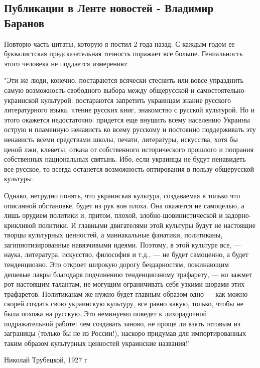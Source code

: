  
 
 
 
 

\subsection{Публикации в Ленте новостей - Владимир Баранов}
\label{sec:01_05_2021.fb.igrunov_vjacheslav.1.ukrainstvo_trubeckoj_nikolaj}

Повторю часть цитаты, которую я постил 2 года назад. С каждым годом ее
буквалистская предсказательная точность поражает все больше. Гениальность этого
человека не поддается измерению:

"Эти же люди, конечно, постараются всячески стеснить или вовсе упразднить самую
возможность свободного выбора между общерусской и самостоятельно-украинской
культурой: постараются запретить украинцам знание русского литературного языка,
чтение русских книг, знакомство с русской культурой. Но и этого окажется
недостаточно: придется еще внушить всему населению Украины острую и пламенную
ненависть ко всему русскому и постоянно поддерживать эту ненависть всеми
средствами школы, печати, литературы, искусства, хотя бы ценой лжи, клеветы,
отказа от собственного исторического прошлого и попрания собственных
национальных святынь. Ибо, если украинцы не будут ненавидеть все русское, то
всегда останется возможность оптирования в пользу общерусской культуры.

Однако, нетрудно понять, что украинская культура, создаваемая в только что
описанной обстановке, будет из рук вон плоха. Она окажется не самоцелью, а лишь
орудием политики и, притом, плохой, злобно-шовинистической и задорно-крикливой
политики. И главными двигателями этой культуры будут не настоящие творцы
культурных ценностей, а маниакальные фанатики, политиканы, загипнотизированные
навязчивыми идеями. Поэтому, в этой культуре все, — наука, литература,
искусство, философия и т.д., — не будет самоценно, а будет тенденциозно. Это
откроет широкую дорогу бездарностям, пожинающим дешевые лавры благодаря
подчинению тенденциозному трафарету, — но зажмет рот настоящим талантам, не
могущим ограничивать себя узкими шорами этих трафаретов. Политиканам же нужно
будет главным образом одно — как можно скорей создать свою украинскую культуру,
все равно какую, только, чтобы не была похожа на русскую. Это неминуемо поведет
к лихорадочной подражательной работе: чем создавать заново, не проще ли взять
готовым из заграницы (только бы не из России!), наскоро придумав для
импортированных таким образом культурных ценностей украинские названия!"

Николай Трубецкой, 1927 г
